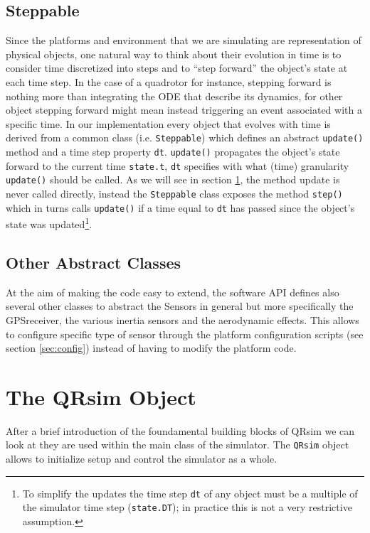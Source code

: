 \documentclass[a4paper,11pt]{report}
\newcommand{\sname}{QRsim\xspace}
\begin{document}
\subsection{Steppable}

Since the platforms and environment that we are simulating are representation of physical objects, one natural way to think about their evolution in time is to consider time discretized into steps and to ``step forward'' the object's state at each time step. In the case of a quadrotor for instance, stepping forward is nothing more than integrating the ODE that describe its dynamics, for other object stepping forward might mean instead triggering an event associated with a specific time.
In our implementation every object that evolves with time is derived from a common class (i.e. \texttt{Steppable}) which defines an abstract \texttt{update()} method and a time step property \texttt{dt}. \texttt{update()} propagates the object's state forward to the current time \texttt{state.t}, \texttt{dt} specifies with what (time) granularity \texttt{update()} should be called. As we will see in section \ref{sec:qrobj}, the method update is never called directly, instead the  \texttt{Steppable} class exposes the method \texttt{step()} which in turns calls \texttt{update()} if a time equal to \texttt{dt} has passed since the object's state was updated\footnote{To simplify the updates the time step \texttt{dt} of any object must be a multiple of the simulator time step (\texttt{state.DT}); in practice this is not a very restrictive assumption.}.

\subsection{Other Abstract Classes}

At the aim of making the code easy to extend, the software API defines also several other classes to abstract the Sensors in general but more specifically the GPSreceiver, the various inertia sensors and the aerodynamic effects. This allows to configure specific type of sensor through the platform configuration scripts (see section \ref{sec:config}) instead of having to modify the platform code.

\section{The \sname Object}\label{sec:qrobj}

After a brief introduction of the foundamental building blocks of \sname we can look at they are used within the main class of the simulator. The \texttt{\sname} object allows to initialize setup and control the simulator as a whole. 
\end{document}
